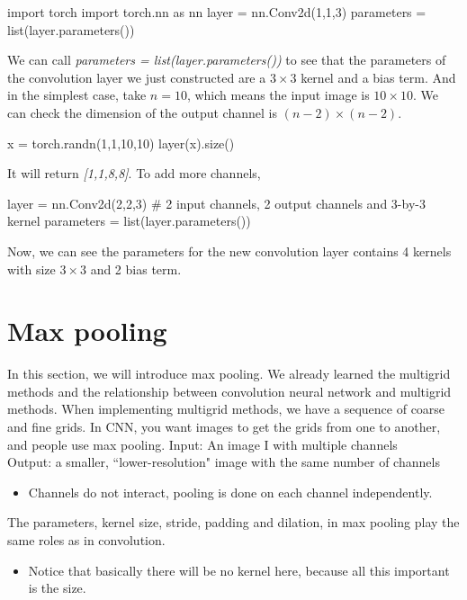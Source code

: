 \begin{python}
import torch
import torch.nn as nn
layer = nn.Conv2d(1,1,3)
parameters = list(layer.parameters())
\end{python}
We can call \emph{parameters = list(layer.parameters())} to see that the parameters of the convolution layer we just constructed are a $3\times 3$ kernel and a bias term. And in the simplest case, take $n=10$, which means the input image is $10\times 10$. We can check the dimension of the output channel is $(n-2)\times (n-2)$.
\begin{python}
x = torch.randn(1,1,10,10)
layer(x).size()
\end{python}
It will return \emph{[1,1,8,8]}. 
To add more channels, 
\begin{python}
layer = nn.Conv2d(2,2,3) # 2 input channels, 2 output channels and 3-by-3 kernel
parameters = list(layer.parameters())
\end{python}
Now, we can see the parameters for the new convolution layer contains 4 kernels with size $3\times 3$ and 2 bias term.



\section{Max pooling} 
In this section, we will introduce max pooling. We already learned the multigrid methods and the relationship between convolution neural network and multigrid methods. When implementing multigrid methods, we have a sequence of coarse and fine grids. In CNN, you want images to get the grids from one to another, and people use max pooling.
Input: An image I with multiple channels \\
Output: a smaller, ``lower-resolution" image with the same number of channels
\begin{itemize}
\item Channels do not interact, pooling is done on each channel independently.
\end{itemize}
The parameters, kernel size, stride, padding and dilation, in max pooling play the same roles as in convolution.
\begin{itemize}
\item Notice that basically there will be no kernel here, because all this important is the size.
\end{itemize}

